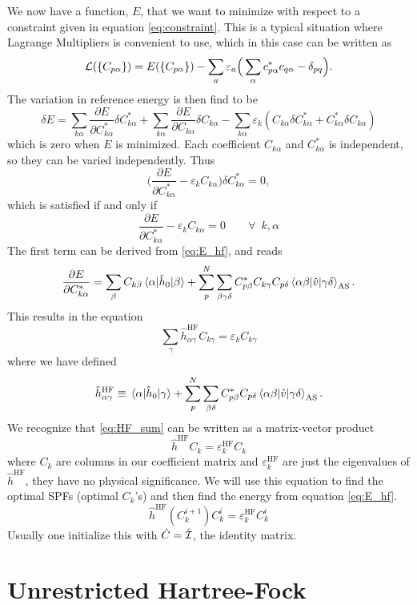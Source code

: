 We now have a function, $E$, that we want to minimize with respect to a constraint given in equation \eqref{eq:constraint}. This is a typical situation where Lagrange Multipliers is convenient to use, which in this case can be written as
\begin{equation}
{\cal L}(\{C_{p\alpha}\})=E(\{C_{p\alpha}\})-\sum_a\varepsilon_a\Big(\sum_{\alpha}c_{p\alpha}^*c_{q\alpha}-\delta_{pq}\Big).
\end{equation}
The variation in reference energy is then find to be
\begin{equation}
\delta E=\sum_{k\alpha}\frac{\partial E}{\partial C_{k\alpha}^*}\delta C_{k\alpha}^*+\sum_{k\alpha}\frac{\partial E}{\partial C_{k\alpha}}\delta C_{k\alpha}-\sum_{k\alpha}\varepsilon_k(C_{k\alpha}\delta C_{k\alpha}^*+C_{k\alpha}^*\delta C_{k\alpha})
\label{eq:E_hf}
\end{equation}
which is zero when $E$ is minimized. Each coefficient $C_{k\alpha}$ and $C_{k\alpha}^*$ is independent, so they can be varied independently. Thus
\begin{equation}
\bigg(\frac{\partial E}{\partial C_{k\alpha}^*}-\varepsilon_kC_{k\alpha}\bigg)\delta C_{k\alpha}^*=0,
\end{equation}
which is satisfied if and only if
\begin{equation}
\frac{\partial E}{\partial C_{k\alpha}^*}-\varepsilon_kC_{k\alpha}=0\qquad\forall\,\,\, k,\alpha
\end{equation}
The first term can be derived from \eqref{eq:E_hf}, and reads
\begin{equation}
\frac{\partial E}{\partial C_{k\alpha}^*}=\sum_{\beta}C_{k\beta}\mel{\alpha}{\hat{h}_0}{\beta}+\sum_p^N\sum_{\beta\gamma\delta}C_{p\beta}^*C_{k\gamma}C_{p\delta}\mel{\alpha\beta}{\hat{v}}{\gamma\delta}_{\text{AS}}.
\end{equation}
This results in the equation
\begin{equation}
\sum_{\gamma}\hat{h}_{\alpha\gamma}^{\text{HF}}C_{k\gamma}=\varepsilon_kC_{k\gamma}
\label{eq:HF_sum}
\end{equation}
where we have defined
\begin{equation}
\hat{h}_{\alpha\gamma}^{\text{HF}}\equiv\mel{\alpha}{\hat{h}_0}{\gamma}+\sum_p^N\sum_{\beta\delta}C_{p\beta}^*C_{p\delta}\mel{\alpha\beta}{\hat{v}}{\gamma\delta}_{\text{AS}}.
\end{equation}
We recognize that \eqref{eq:HF_sum} can be written as a matrix-vector product
\begin{equation}
\hat{h}^{\text{HF}}C_k=\varepsilon_k^{\text{HF}}C_k
\end{equation}
where $C_k$ are columns in our coefficient matrix and $\varepsilon_k^{\text{HF}}$ are just the eigenvalues of $\hat{h}^{\text{HF}}$, they have no physical significance. We will use this equation to find the optimal SPFs (optimal $C_k$'s) and then find the energy from equation \eqref{eq:E_hf}.
\begin{equation}
\hat{h}^{\text{HF}}(C_k^{i+1})C_k^i=\varepsilon_k^{\text{HF}}C_k^i
\label{eq:HF_iter}
\end{equation}
Usually one initialize this with $\hat{C}=\hat{{\cal I}}$, the identity matrix.

\section{Unrestricted Hartree-Fock}
